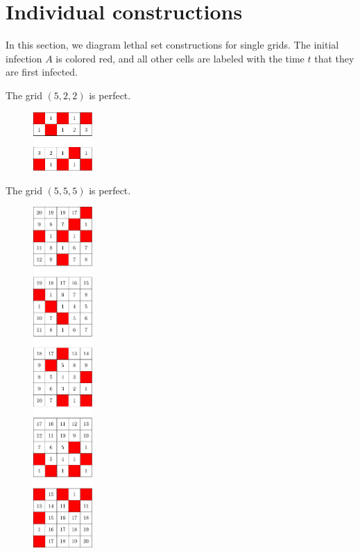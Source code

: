 \section{Individual constructions}

In this section, we diagram lethal set constructions for single grids. The initial infection $A$ is colored red, and all other cells are labeled with the time $t$ that they are first infected. 

\begin{con}
The grid $(5,2,2)$ is perfect.
\end{con}

\begin{figure}[]
\centering
\includegraphics[width=0.2\textwidth]{figures/4/2x5x2_numbered_heatmap.pdf}
\caption{}
\label{fig:2x5x2_numbered_heatmap.pdf}
\end{figure} 

\begin{con}
The grid $(5,5,5)$ is perfect.
\end{con}

\begin{figure}[]
\centering
\includegraphics[width=0.2\textwidth]{figures/4/5x5x5_numbered_heatmap.pdf}
\caption{}
\label{fig:5x5x5_numbered_heatmap.pdf}
\end{figure}

